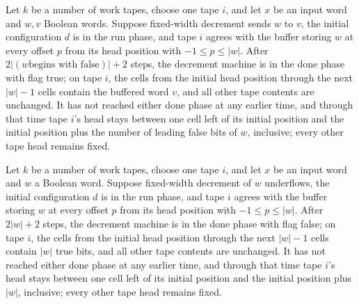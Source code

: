 \begin{theorem}
\label{Turing.decrementTM_run_succ_ofCfg}
\leanok
{}
Let $k$ be a number of work tapes, choose one tape $i$, and let $x$ be an input word and
$w,v$ Boolean words. Suppose fixed-width decrement sends $w$ to $v$, the initial
configuration $d$ is in the run phase, and tape $i$ agrees with the buffer storing $w$
at every offset $p$ from its head position with $-1\le p\le |w|$. After $2|(w\text{
begins with false})|+2$ steps, the decrement machine is in the done phase with flag
true; on tape $i$, the cells from the initial head position through the next $|w|-1$
cells contain the buffered word $v$, and all other tape contents are unchanged. It has
not reached either done phase at any earlier time, and through that time tape $i$'s head
stays between one cell left of its initial position and the initial position plus the
number of leading false bits of $w$, inclusive; every other tape head remains fixed.
\end{theorem}

\begin{theorem}
\label{Turing.decrementTM_run_underflow_ofCfg}
\leanok
{}
Let $k$ be a number of work tapes, choose one tape $i$, and let $x$ be an input word and
$w$ a Boolean word. Suppose fixed-width decrement of $w$ underflows, the initial
configuration $d$ is in the run phase, and tape $i$ agrees with the buffer storing $w$
at every offset $p$ from its head position with $-1\le p\le |w|$. After $2|w|+2$ steps,
the decrement machine is in the done phase with flag false; on tape $i$, the cells from
the initial head position through the next $|w|-1$ cells contain $|w|$ true bits, and
all other tape contents are unchanged. It has not reached either done phase at any
earlier time, and through that time tape $i$'s head stays between one cell left of its
initial position and the initial position plus $|w|$, inclusive; every other tape head
remains fixed.
\end{theorem}

